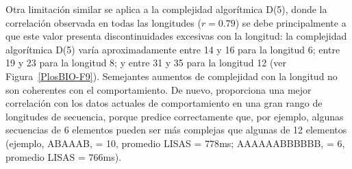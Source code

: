 Otra limitación similar se aplica a la complejidad algorítmica D(5), donde la correlación observada en todas las longitudes ($r = 0.79$) se debe principalmente a que este valor presenta discontinuidades excesivas con la longitud: la complejidad algorítmica D(5) varía aproximadamente entre 14 y 16 para la longitud 6; entre 19 y 23 para la longitud 8; y entre 31 y 35 para la longitud 12 (ver Figura~\ref{PlosBIO-F9}). Semejantes aumentos de complejidad con la longitud no son coherentes con el comportamiento. De nuevo, \mdlbin proporciona una mejor correlación con los datos actuales de comportamiento en una gran rango de longitudes de secuencia, porque predice correctamente que, por ejemplo, algunas secuencias de 6 elementos pueden ser más complejas que algunas de 12 elementos (ejemplo, ABAAAB, \mdlbin = 10, promedio LISAS = $778$ms; AAAAAABBBBBB, \mdlbin = 6, promedio LISAS = $766$ms).

